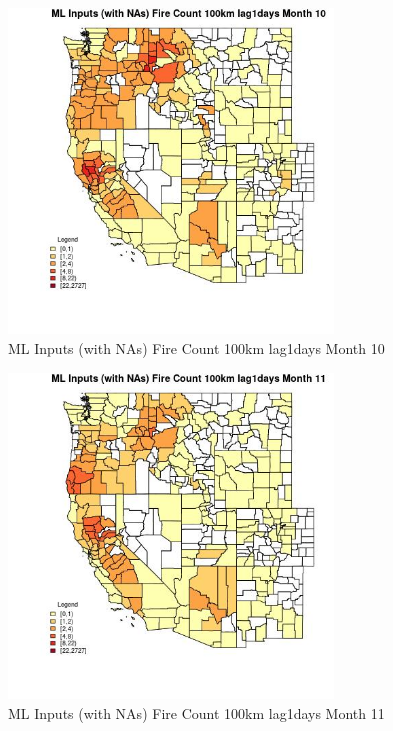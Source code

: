 \begin{figure} 
\centering  
\includegraphics[width=0.77\textwidth]{Code_Outputs/Report_ML_input_PM25_Step4_part_f_de_duplicated_aveswNAs_CountyFire_Count_100km_lag1daysmedianMonth10.jpg} 
\caption{\label{fig:Report_ML_input_PM25_Step4_part_f_de_duplicated_aveswNAsCountyFire_Count_100km_lag1daysmedianMonth10}ML Inputs (with NAs) Fire Count 100km lag1days Month 10} 
\end{figure} 
 

\begin{figure} 
\centering  
\includegraphics[width=0.77\textwidth]{Code_Outputs/Report_ML_input_PM25_Step4_part_f_de_duplicated_aveswNAs_CountyFire_Count_100km_lag1daysmedianMonth11.jpg} 
\caption{\label{fig:Report_ML_input_PM25_Step4_part_f_de_duplicated_aveswNAsCountyFire_Count_100km_lag1daysmedianMonth11}ML Inputs (with NAs) Fire Count 100km lag1days Month 11} 
\end{figure} 
 

